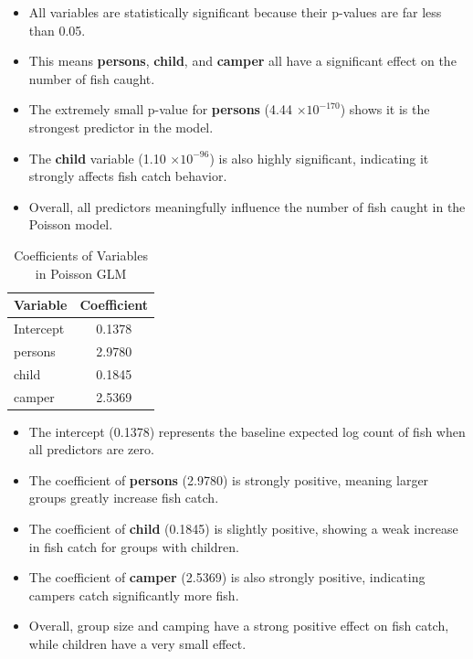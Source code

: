 \documentclass[12pt,a4paper]{report}
\begin{document}
\begin{tcolorbox}[colback=blue!5!white,colframe=blue!70!black,title=Interpretation]
\begin{itemize}
    \item All variables are statistically significant because their p-values are far less than 0.05.
    \item This means \textbf{persons}, \textbf{child}, and \textbf{camper} all have a significant effect on the number of fish caught.
    \item The extremely small p-value for \textbf{persons} (4.44 $\times 10^{-170}$) shows it is the strongest predictor in the model.
    \item The \textbf{child} variable (1.10 $\times 10^{-96}$) is also highly significant, indicating it strongly affects fish catch behavior.
    \item Overall, all predictors meaningfully influence the number of fish caught in the Poisson model.
\end{itemize}
\end{tcolorbox}
\begin{table}[h!]
\centering
\begin{tabular}{|l|c|}
\hline
\textbf{Variable} & \textbf{Coefficient} \\ \hline
Intercept & 0.1378 \\ \hline
persons   & 2.9780 \\ \hline
child     & 0.1845 \\ \hline
camper    & 2.5369 \\ \hline
\end{tabular}
\caption{Coefficients of Variables in Poisson GLM}
\label{tab:poisson_glm_coef}
\end{table}

\begin{tcolorbox}[colback=blue!5!white,colframe=blue!70!black,title=Interpretation]
\begin{itemize}
    \item The intercept (0.1378) represents the baseline expected log count of fish when all predictors are zero.
    \item The coefficient of \textbf{persons} (2.9780) is strongly positive, meaning larger groups greatly increase fish catch.
    \item The coefficient of \textbf{child} (0.1845) is slightly positive, showing a weak increase in fish catch for groups with children.
    \item The coefficient of \textbf{camper} (2.5369) is also strongly positive, indicating campers catch significantly more fish.
    \item Overall, group size and camping have a strong positive effect on fish catch, while children have a very small effect.
\end{itemize}
\end{tcolorbox}
\clearpage
\end{document}
